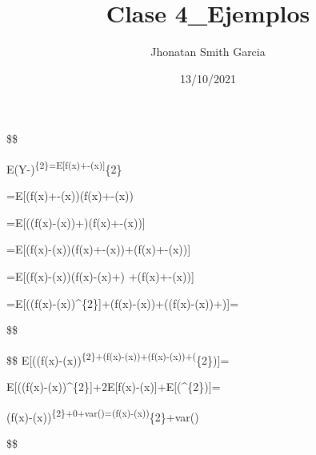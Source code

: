 \documentclass[
]{article}
\title{Clase 4\_Ejemplos}
\author{Jhonatan Smith Garcia}
\date{13/10/2021}
\begin{document}
\maketitle

\$\$

E(Y-)\textsuperscript{\{2\}=E{[}f(x)+\varepsilon-(x){]}}\{2\}

=E{[}(f(x)+\varepsilon-(x))(f(x)+\varepsilon-(x))

=E{[}((f(x)-(x))+\varepsilon )(f(x)+\varepsilon -(x)){]}

=E{[}(f(x)-(x))(f(x)+\varepsilon -(x))+\varepsilon (f(x)+\varepsilon -(x)){]}
\[
\]

=E{[}(f(x)-(x))(f(x)-(x)+\varepsilon)
+\varepsilon (f(x)+\varepsilon -(x)){]}

=E{[}((f(x)-(x))\^{}\{2\}{]}+\varepsilon(f(x)-(x))+\varepsilon((f(x)-(x))+\varepsilon){]}=

\$\$

\$\$
E{[}((f(x)-(x))\textsuperscript{\{2\}+\varepsilon (f(x)-(x))+\varepsilon (f(x)-(x))+(\varepsilon }\{2\}){]}=

E{[}((f(x)-(x))\^{}\{2\}{]}+2E{[}f(x)-(x){]}+E{[}(\varepsilon \^{}\{2\}){]}=

(f(x)-(x))\textsuperscript{\{2\}+0+var(\varepsilon )=(f(x)-(x))}\{2\}+var(\varepsilon )

\newpage

\$\$
\end{document}
